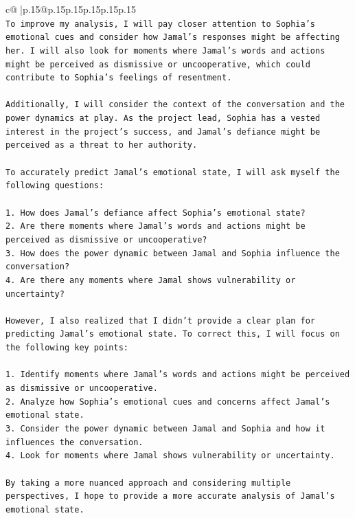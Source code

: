 \documentclass{article}
\begin{document}
{\begin{supertabular}{c@{$\;$}|p{.15\linewidth}@{}p{.15\linewidth}p{.15\linewidth}p{.15\linewidth}p{.15\linewidth}p{.15\linewidth}}
{{{\\ 
\texttt{To improve my analysis, I will pay closer attention to Sophia's emotional cues and consider how Jamal's responses might be affecting her. I will also look for moments where Jamal's words and actions might be perceived as dismissive or uncooperative, which could contribute to Sophia's feelings of resentment. } \\
\\ 
\texttt{Additionally, I will consider the context of the conversation and the power dynamics at play. As the project lead, Sophia has a vested interest in the project's success, and Jamal's defiance might be perceived as a threat to her authority. } \\
\\ 
\texttt{To accurately predict Jamal's emotional state, I will ask myself the following questions:} \\
\\ 
\texttt{1. How does Jamal's defiance affect Sophia's emotional state?} \\
\texttt{2. Are there moments where Jamal's words and actions might be perceived as dismissive or uncooperative?} \\
\texttt{3. How does the power dynamic between Jamal and Sophia influence the conversation?} \\
\texttt{4. Are there any moments where Jamal shows vulnerability or uncertainty?} \\
\\ 
\texttt{However, I also realized that I didn't provide a clear plan for predicting Jamal's emotional state. To correct this, I will focus on the following key points:} \\
\\ 
\texttt{1. Identify moments where Jamal's words and actions might be perceived as dismissive or uncooperative.} \\
\texttt{2. Analyze how Sophia's emotional cues and concerns affect Jamal's emotional state.} \\
\texttt{3. Consider the power dynamic between Jamal and Sophia and how it influences the conversation.} \\
\texttt{4. Look for moments where Jamal shows vulnerability or uncertainty.} \\
\\ 
\texttt{By taking a more nuanced approach and considering multiple perspectives, I hope to provide a more accurate analysis of Jamal's emotional state.} \\
}}}
\end{supertabular}}
\end{document}
